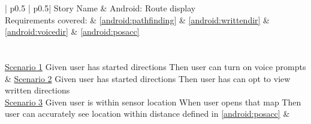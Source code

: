 \begin{longtable}{| p{} | p{}|}
	\hline
	\newline Story Name & \newline Android: Route display\\\hline
	\newline Requirements covered: & \ref{android:pathfinding} \& \ref{android:writtendir} \& \ref{android:voicedir} \& \ref{android:posacc}\\\hline
	\\\hline
	\\\hline
	\newline\underline{Scenario 1}\newline
	Given user has started directions \newline 
	Then user can turn on voice prompts\newline
	&
	\newline\underline{Scenario 2}\newline
	Given user has started directions \newline 
	Then user has can opt to view written directions \newline
	\\\hline
	\newline\underline{Scenario 3}\newline
	Given user is within sensor location \newline 
	When user opens that map \newline
	Then user can accurately see location within distance defined in \ref{android:posacc} \newline
	&
	\\\hline
\end{longtable}



